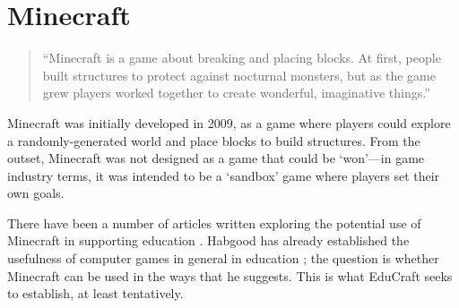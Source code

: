 \section{Minecraft}
\begin{quote}
``Minecraft is a game about breaking and placing blocks. At first, people
built structures to protect against nocturnal monsters, but as the game grew
players worked together to create wonderful, imaginative things.''
\cite{website:minecraft}
\end{quote}

Minecraft was initially developed in 2009, as a game where players could
explore a randomly-generated world and place blocks to build structures. From
the outset, Minecraft was not designed as a game that could be `won'---in
game industry terms, it was intended to be a `sandbox' game where players set
their own goals.

There have been a number of articles written exploring the potential use of
Minecraft in supporting education \cite{brand13,short12}. Habgood has
already established the usefulness of computer games in general in education
\cite{habgood07}; the question is whether Minecraft can be used in the ways
that he suggests. This is what EduCraft seeks to establish, at least tentatively.
